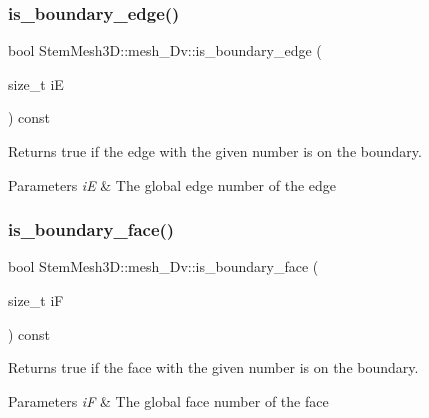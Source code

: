 \subsubsection{\texorpdfstring{is\+\_\+boundary\+\_\+edge()}{is\_boundary\_edge()}}
{\footnotesize\ttfamily bool Stem\+Mesh3\+D\+::mesh\+\_\+Dv\+::is\+\_\+boundary\+\_\+edge (\begin{DoxyParamCaption}\item[{size\+\_\+t}]{iE }\end{DoxyParamCaption}) const}



Returns true if the edge with the given number is on the boundary. 


\begin{DoxyParams}{Parameters}
{\em iE} & The global edge number of the edge \\
\hline
\end{DoxyParams}
\mbox{\label{classStemMesh3D_1_1mesh__3Dv_a3c02e5034f9c9e08ae91057fb165fbad}} 
\subsubsection{\texorpdfstring{is\+\_\+boundary\+\_\+face()}{is\_boundary\_face()}}
{\footnotesize\ttfamily bool Stem\+Mesh3\+D\+::mesh\+\_\+Dv\+::is\+\_\+boundary\+\_\+face (\begin{DoxyParamCaption}\item[{size\+\_\+t}]{iF }\end{DoxyParamCaption}) const}



Returns true if the face with the given number is on the boundary. 


\begin{DoxyParams}{Parameters}
{\em iF} & The global face number of the face \\
\hline
\end{DoxyParams}
\mbox{\label{classStemMesh3D_1_1mesh__3Dv_a3c3a3d3014b5e7d097facf759364f6a7}} 
